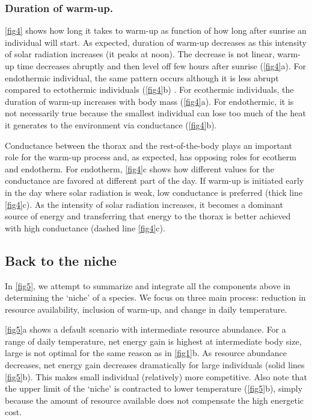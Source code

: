 \subsubsection*{Duration of warm-up.}
\cref{fig4} shows how long it takes to warm-up as function of how long after sunrise an individual will start.
As expected, duration of warm-up decreases as this intensity of solar radiation increases (it peaks at noon).
The decrease is not linear, warm-up time decreases abruptly and then level off few hours after sunrise (\cref{fig4}a).
For endothermic individual, the same pattern occurs although it is less abrupt compared to ectothermic individuals (\cref{fig4}b) .
For ecothermic individuals, the duration of warm-up increases with body mass (\cref{fig4}a).
For endothermic, it is not necessarily true because the smallest individual can lose too much of the heat it generates to the environment via conductance (\cref{fig4}b).

Conductance between the thorax and the rest-of-the-body plays an important role for the warm-up process and, as expected, has opposing roles for ecotherm and endotherm.
For endotherm, \cref{fig4}c shows how different values for the conductance are favored at different part of the day.
If warm-up is initiated early in the day where solar radiation is weak, low conductance is preferred (thick line \cref{fig4}c).
As the intensity of solar radiation increases, it becomes a dominant source of energy and transferring that energy to the thorax is better achieved with high conductance (dashed line \cref{fig4}c).

\subsection*{Back to the niche}
In \cref{fig5}, we attempt to summarize and integrate all the components above in determining the `niche' of a species.
We focus on three main process: reduction in resource availability, inclusion of warm-up, and change in daily temperature.

\cref{fig5}a shows a default scenario with intermediate resource abundance.
For a range of daily temperature, net energy gain is highest at intermediate body size, large is not optimal for the same reason as in \cref{fig1}b.
As resource abundance decreases, net energy gain decreases dramatically for large individuals (solid lines \cref{fig5}b).
This makes small individual (relatively) more competitive.
Also note that the upper limit of the `niche' is contracted to lower temperature (\cref{fig5}b), simply because the amount of resource available does not compensate the high energetic cost.

